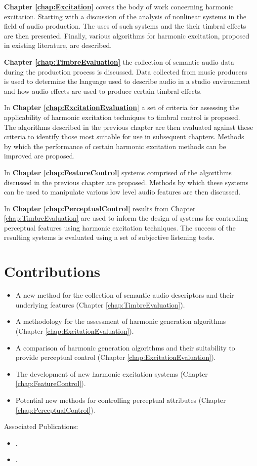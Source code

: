 	{\bf{Chapter \ref{chap:Excitation}}} covers the body of work concerning harmonic excitation. Starting with a
	discussion of the analysis of nonlinear systems in the field of audio production. The uses of such systems and the
	their timbral effects are then presented. Finally, various algorithms for harmonic excitation, proposed in existing
	literature, are described.

	{\bf{Chapter \ref{chap:TimbreEvaluation}}} the collection of semantic audio data during the production process is
	discussed. Data collected from music producers is used to determine the language used to describe audio in a studio
	environment and how audio effects are used to produce certain timbral effects.

	In {\bf{Chapter \ref{chap:ExcitationEvaluation}}} a set of criteria for assessing the applicability of
	harmonic excitation techniques to timbral control is proposed. The algorithms described in the previous chapter are
	then evaluated against these criteria to identify those most suitable for use in subsequent chapters. Methods by
	which the performance of certain harmonic excitation methods can be improved are proposed.

	In {\bf{Chapter \ref{chap:FeatureControl}}} systems comprised of the algorithms discussed in the previous
	chapter are proposed. Methods by which these systems can be used to manipulate various low level audio features are
	then discussed.

	In {\bf{Chapter \ref{chap:PerceptualControl}}} results from Chapter \ref{chap:TimbreEvaluation} are used to inform
	the design of systems for controlling perceptual features using harmonic excitation techniques. The success of the
	resulting systems is evaluated using a set of subjective listening tests.

\section{Contributions}
\label{sec:Introduction-Contributions}


	\begin{itemize}
		\item A new method for the collection of semantic audio descriptors and their underlying features (Chapter
		      \ref{chap:TimbreEvaluation}).
		\item A methodology for the assessment of harmonic generation algorithms (Chapter
		      \ref{chap:ExcitationEvaluation}).
		\item A comparison of harmonic generation algorithms and their suitability to provide perceptual control
		      (Chapter \ref{chap:ExcitationEvaluation}).
		\item The development of new harmonic excitation systems (Chapter \ref{chap:FeatureControl}).
		\item Potential new methods for controlling perceptual attributes (Chapter \ref{chap:PerceptualControl}).
	\end{itemize}

	Associated Publications:

	\begin{itemize}
		\item {}.
		\item {}.
	\end{itemize}

